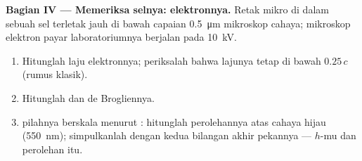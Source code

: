 \begin{problem}
\medskip
\noindent\textbf{Bagian IV --- Memeriksa selnya:  elektronnya.}
Retak mikro di dalam sebuah sel terletak jauh di bawah capaian \qty{0.5}{\micro m} mikroskop
cahaya; mikroskop elektron payar laboratoriumnya berjalan pada \qty{10}{kV}.
\begin{enumerate}[resume]
  \item Hitunglah laju elektronnya; periksalah bahwa lajunya tetap di bawah $0.25\,c$ (rumus klasik).
  \item Hitunglah  dan  de Brogliennya.
  \item {} pilahnya berskala menurut : hitunglah perolehannya atas cahaya hijau
        (\qty{550}{nm}); simpulkanlah dengan kedua bilangan akhir pekannya --- $h$-mu
        dan perolehan itu.
\end{enumerate}
\end{problem}
